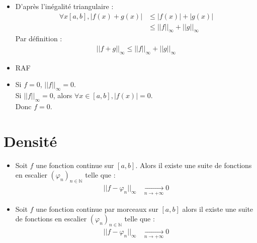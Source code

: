 \documentclass[../main.tex]{subfiles}
\begin{document}
\begin{itemize}
    \item D'après l'inégalité triangulaire : 
    \begin{align*}
        \forall x [a, b], |f(x) + g(x)| &\leq |f(x)| + |g(x)| \\
        &\leq ||f||_{\infty} + ||g||_{\infty}
    \end{align*}
    Par définition : 
    \begin{align*}
        ||f + g||_{\infty} \leq ||f||_{\infty} + ||g||_{\infty}
    \end{align*}
    \item RAF
    \item Si $f = 0$, $||f||_{\infty} = 0$. \\
    Si $||f||_{\infty} = 0$, alors $\forall x\in [a, b], |f(x)| = 0$. \\
    Donc $f = 0$. 
\end{itemize}

\section{Densité}
\begin{tcolorbox}[title=Théorème 26.63, title filled=false, colframe=orange, colback=orange!10!white]
    \begin{itemize}
        \item Soit $f$ une fonction continue sur $[a, b]$. Alors il existe une suite de fonctions en escalier $(\varphi_n)_{n\in \mathbb{N}}$ telle que :
        \begin{align*}
            ||f - \varphi_n||_{\infty} &\underset{n \to +\infty}{\longrightarrow} 0
        \end{align*}
        \item Soit $f$ une fonction continue par morceaux sur $[a, b]$ alors il existe une suite de fonctions en escalier $(\varphi_n)_{n\in \mathbb{N}}$ telle que :
        \begin{align*}
            ||f - \varphi_n||_{\infty} &\underset{n \to +\infty}{\longrightarrow} 0
        \end{align*}
    \end{itemize}
\end{tcolorbox}
\end{document}

